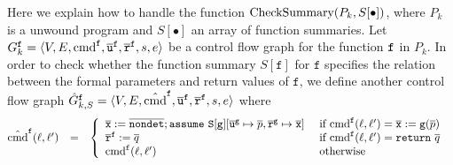 Here we explain how to handle the function $\textmd{CheckSummary} (P_k, S[\bullet])$, where $P_k$ is a unwound program and $S[\bullet]$ an
array of function summaries.
Let $G^{\mathtt{{f}}}_k = \langle V, E, \textmd{cmd}^{\mathtt{{f}}}, \overline{\mathtt{u}}^{\mathtt{{f}}}, \overline{\mathtt{r}}^{\mathtt{{f}}},s,e \rangle$ be a
control flow graph for the function $\mathtt{{f}}$ in $P_k$. In order to check whether the function
summary $S[{\mathtt{f}}]$ for $\mathtt{f}$ specifies the relation 
between the formal parameters and return values of $\mathtt{f}$, 
we define another control flow graph
$\hat{G}^{\mathtt{{f}}}_{k,S} = \langle V, E, \hat{\textmd{cmd}}^{\mathtt{{f}}}, \overline{\mathtt{u}}^{\mathtt{{f}}}, \overline{\mathtt{r}}^{\mathtt{{f}}},s,e \rangle$ where
\begin{equation*}
\hspace{-0.2cm}
  \begin{array}{rcl}
    \hat{\textmd{cmd}}^\fun{f} (\ell, \ell') & = &
    \left\{
      \begin{array}{ll}
        \overline{\mathtt{x}} := 
        \overline{\mathtt{nondet}};
        \mathtt{assume\ S[{\mathtt{g}}]}[
        \mathtt{\overline{u}^g} \mapsto \overline{p},
        \mathtt{\overline{r}^g} \mapsto \overline{\mathtt{x}}]    
        &
        \textmd{ if } \textmd{cmd}^\fun{f} (\ell, \ell') = 
        \overline{\mathtt{x}} := \mathtt{g} (\overline{p})\\
		\mathtt{\overline{r}}^\fun{f} := \overline{q}
        &
        \textmd{ if } \textmd{cmd}^\fun{f} (\ell, \ell') = \mathtt{return\ }
        \overline{q}\\
        \textmd{cmd}^\fun{f} (\ell, \ell')
        &
		\textmd{ otherwise}        
      \end{array}
    \right.
  \end{array}
\end{equation*}

